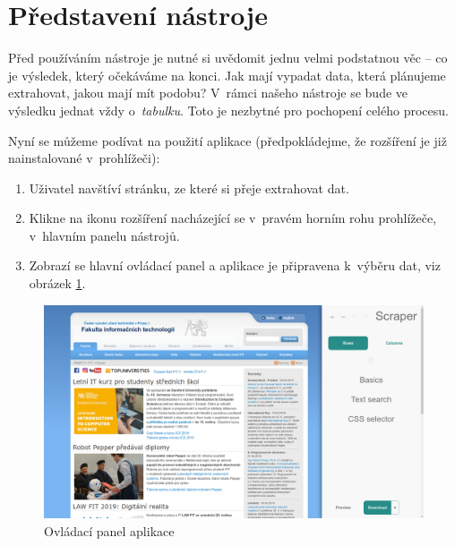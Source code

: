 \documentclass[thesis=B,czech]{FITthesis}[2012/06/26]
\begin{document}

\section{Představení nástroje}
Před používáním nástroje je nutné si uvědomit jednu velmi podstatnou věc -- co je výsledek, který očekáváme na konci. Jak mají vypadat data, která plánujeme extrahovat, jakou mají mít podobu? V~rámci našeho nástroje se bude ve výsledku jednat vždy o~\emph{tabulku}. Toto je nezbytné pro pochopení celého procesu.

Nyní se můžeme podívat na použití aplikace (předpokládejme, že rozšíření je již nainstalované v~prohlížeči):
\begin{enumerate}
	\item Uživatel navštíví stránku, ze které si přeje extrahovat dat.
	\item Klikne na ikonu rozšíření nacházející se v~pravém horním rohu prohlížeče, v~hlavním panelu nástrojů.
	\item Zobrazí se hlavní ovládací panel a aplikace je připravena k~výběru dat, viz obrázek \ref{fig:scraper_control_panel}.
\end{enumerate}
\begin{figure}
	\includegraphics[width=\linewidth]{images/Scraper_control_panel.png}
	\caption{Ovládací panel aplikace}
	\label{fig:scraper_control_panel}
\end{figure}
\end{document}
